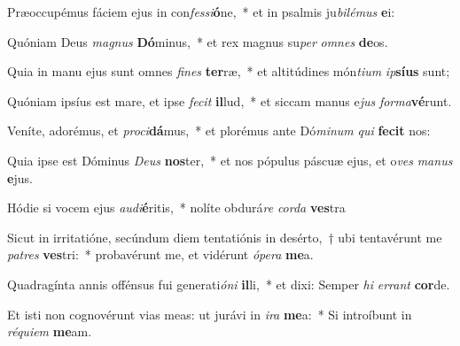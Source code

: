 \item Præoccupémus fáciem ejus in con\textit{fes}\textit{si}\textbf{ó}ne,~* et in psalmis ju\textit{bi}\textit{lé}\textit{mus} \textbf{e}i:
\item Quóniam Deus \textit{ma}\textit{gnus} \textbf{Dó}minus,~* et rex magnus su\textit{per} \textit{om}\textit{nes} \textbf{de}os.
\item Quia in manu ejus sunt omnes \textit{fi}\textit{nes} \textbf{ter}ræ,~* et altitúdines món\textit{ti}\textit{um} \textit{ip}\textbf{sí}\textbf{us} sunt;
\item Quóniam ipsíus est mare, et ipse \textit{fe}\textit{cit} \textbf{il}lud,~* et siccam manus e\textit{jus} \textit{for}\textit{ma}\textbf{vé}runt.
\item Veníte, adorémus, et \textit{pro}\textit{ci}\textbf{dá}mus,~* et plorémus ante Dó\textit{mi}\textit{num} \textit{qui} \textbf{fe}\textbf{cit} nos:
\item Quia ipse est Dóminus \textit{De}\textit{us} \textbf{nos}ter,~* et nos pópulus páscuæ ejus, et o\textit{ves} \textit{ma}\textit{nus} \textbf{e}jus.
\item Hódie si vocem ejus \textit{au}\textit{di}\textbf{é}ritis,~* nolíte obdurá\textit{re} \textit{cor}\textit{da} \textbf{ves}tra
\item Sicut in irritatióne, secúndum diem tentatiónis in desérto,~† ubi tentavérunt me \textit{pa}\textit{tres} \textbf{ves}tri:~* probavérunt me, et vidérunt \textit{ó}\textit{pe}\textit{ra} \textbf{me}a.
\item Quadragínta annis offénsus fui generati\textit{ó}\textit{ni} \textbf{il}li,~* et dixi: Semper \textit{hi} \textit{er}\textit{rant} \textbf{cor}de.
\item Et isti non cognovérunt vias meas: ut jurávi in \textit{i}\textit{ra} \textbf{me}a:~* Si introíbunt in \textit{ré}\textit{qui}\textit{em} \textbf{me}am.
